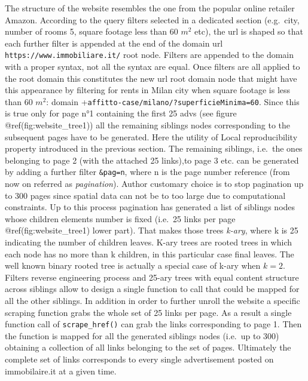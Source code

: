 \documentclass[
  12pt,
  a4paper,
  oneside]{book}
\theoremstyle{definition}
\theoremstyle{definition}
\theoremstyle{definition}
\theoremstyle{remark}
\begin{document}
The structure of the website resembles the one from the popular online retailer Amazon. According to the query filters selected in a dedicated section (e.g.~city, number of rooms 5, square footage less than 60 \(m^2\) etc), the url is shaped so that each further filter is appended at the end of the domain url \texttt{https://www.immobiliare.it/} root node. Filters are appended to the domain with a proper syntax, not all the syntax are equal. Once filters are all applied to the root domain this constitutes the new url root domain node that might have this appearance by filtering for rents in Milan city when square footage is less than 60 \(m^2\): domain +\texttt{affitto-case/milano/?superficieMinima=60}. Since this is true only for page n°1 containing the first 25 advs (see figure @ref(fig:website\_tree1)) all the remaining siblings nodes corresponding to the subsequent pages have to be generated. Here the utility of Local reproducibility property introduced in the previous section. The remaining siblings, i.e.~the ones belonging to page 2 (with the attached 25 links),to page 3 etc. can be generated by adding a further filter \texttt{\&pag=n}, where n is the page number reference (from now on referred as \emph{pagination}). Author customary choice is to stop pagination up to 300 pages since spatial data can not be to too large due to computational constraints.
Up to this process pagination has generated a list of siblings nodes whose children elements number is fixed (i.e.~25 links per page @ref(fig:website\_tree1) lower part). That makes those trees \emph{k-ary}, where k is 25 indicating the number of children leaves. K-ary trees are rooted trees in which each node has no more than k children, in this particular case final leaves. The well known binary rooted tree is actually a special case of k-ary when \(k = 2\). Filters reverse engineering process and 25-ary trees with equal content structure across siblings allow to design a single function to call that could be mapped for all the other siblings. In addition in order to further unroll the website a specific scraping function grabs the whole set of 25 links per page. As a result a single function call of \texttt{scrape\_href()} can grab the links corresponding to page 1. Then the function is mapped for all the generated siblings nodes (i.e.~up to 300) obtaining a collection of all links belonging to the set of pages. Ultimately the complete set of links corresponds to every single advertisement posted on immobilaire.it at a given time.
\end{document}
